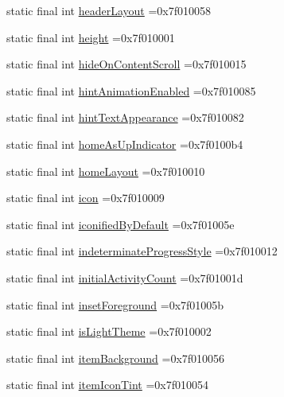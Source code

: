 \begin{DoxyCompactItemize}
\item 
static final int \hyperlink{classcheck_1_1test_1_1_r_1_1attr_aa746f0c87830e1191999d068e48d164b}{header\+Layout} =0x7f010058
\item 
static final int \hyperlink{classcheck_1_1test_1_1_r_1_1attr_ad0373977141facd56b9a985852b9a5c4}{height} =0x7f010001
\item 
static final int \hyperlink{classcheck_1_1test_1_1_r_1_1attr_ae2d6e7290f2cd4974b305b03b1f5f329}{hide\+On\+Content\+Scroll} =0x7f010015
\item 
static final int \hyperlink{classcheck_1_1test_1_1_r_1_1attr_ac56c15568d0c8ec982363888f65d9c17}{hint\+Animation\+Enabled} =0x7f010085
\item 
static final int \hyperlink{classcheck_1_1test_1_1_r_1_1attr_ad43181e17e280e930e2c2f62ba67cd24}{hint\+Text\+Appearance} =0x7f010082
\item 
static final int \hyperlink{classcheck_1_1test_1_1_r_1_1attr_a337a62ef9d44c64d88a4136aca1a5d52}{home\+As\+Up\+Indicator} =0x7f0100b4
\item 
static final int \hyperlink{classcheck_1_1test_1_1_r_1_1attr_a2ea41d239ed9fa5e737ac3d46fa3c567}{home\+Layout} =0x7f010010
\item 
static final int \hyperlink{classcheck_1_1test_1_1_r_1_1attr_a6cc6cb2d226afebb2e5d8eeb8175ad45}{icon} =0x7f010009
\item 
static final int \hyperlink{classcheck_1_1test_1_1_r_1_1attr_aeb43240baae0ba0739bca74fbbd9e646}{iconified\+By\+Default} =0x7f01005e
\item 
static final int \hyperlink{classcheck_1_1test_1_1_r_1_1attr_a2582eb7d8088fc5a12dda81d97afd3f6}{indeterminate\+Progress\+Style} =0x7f010012
\item 
static final int \hyperlink{classcheck_1_1test_1_1_r_1_1attr_ae07c86d286d5a2d111131c1aec5f6c98}{initial\+Activity\+Count} =0x7f01001d
\item 
static final int \hyperlink{classcheck_1_1test_1_1_r_1_1attr_adfd84b8f85801bd839c904634053b06f}{inset\+Foreground} =0x7f01005b
\item 
static final int \hyperlink{classcheck_1_1test_1_1_r_1_1attr_a6c048dd7eef7fe7b77e391b95f7a1a93}{is\+Light\+Theme} =0x7f010002
\item 
static final int \hyperlink{classcheck_1_1test_1_1_r_1_1attr_a11b086908d75b84fb5b23568084c00d8}{item\+Background} =0x7f010056
\item 
static final int \hyperlink{classcheck_1_1test_1_1_r_1_1attr_afb89a06e82ef49ce6b57555061f15032}{item\+Icon\+Tint} =0x7f010054

\end{DoxyCompactItemize}
